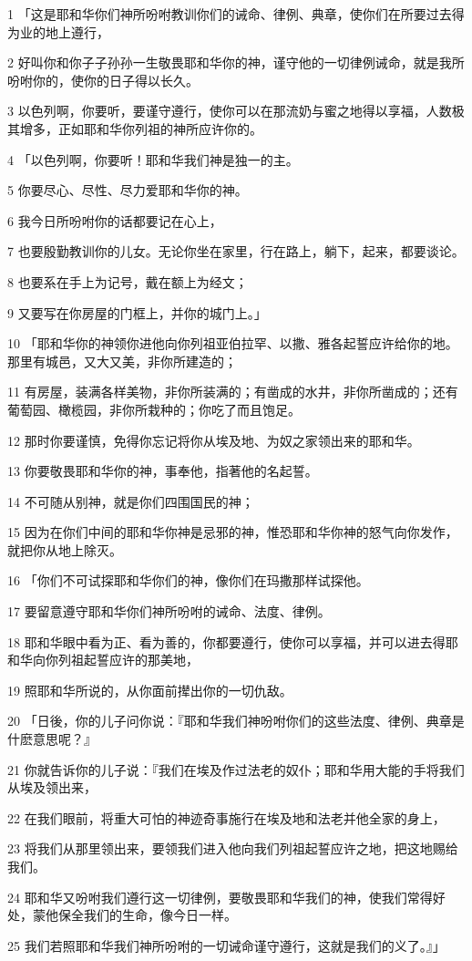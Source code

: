 \par 1 「这是耶和华你们神所吩咐教训你们的诫命、律例、典章，使你们在所要过去得为业的地上遵行，
\par 2 好叫你和你子子孙孙一生敬畏耶和华你的神，谨守他的一切律例诫命，就是我所吩咐你的，使你的日子得以长久。
\par 3 以色列啊，你要听，要谨守遵行，使你可以在那流奶与蜜之地得以享福，人数极其增多，正如耶和华你列祖的神所应许你的。
\par 4 「以色列啊，你要听！耶和华我们神是独一的主。
\par 5 你要尽心、尽性、尽力爱耶和华你的神。
\par 6 我今日所吩咐你的话都要记在心上，
\par 7 也要殷勤教训你的儿女。无论你坐在家里，行在路上，躺下，起来，都要谈论。
\par 8 也要系在手上为记号，戴在额上为经文；
\par 9 又要写在你房屋的门框上，并你的城门上。」
\par 10 「耶和华你的神领你进他向你列祖亚伯拉罕、以撒、雅各起誓应许给你的地。那里有城邑，又大又美，非你所建造的；
\par 11 有房屋，装满各样美物，非你所装满的；有凿成的水井，非你所凿成的；还有葡萄园、橄榄园，非你所栽种的；你吃了而且饱足。
\par 12 那时你要谨慎，免得你忘记将你从埃及地、为奴之家领出来的耶和华。
\par 13 你要敬畏耶和华你的神，事奉他，指著他的名起誓。
\par 14 不可随从别神，就是你们四围国民的神；
\par 15 因为在你们中间的耶和华你神是忌邪的神，惟恐耶和华你神的怒气向你发作，就把你从地上除灭。
\par 16 「你们不可试探耶和华你们的神，像你们在玛撒那样试探他。
\par 17 要留意遵守耶和华你们神所吩咐的诫命、法度、律例。
\par 18 耶和华眼中看为正、看为善的，你都要遵行，使你可以享福，并可以进去得耶和华向你列祖起誓应许的那美地，
\par 19 照耶和华所说的，从你面前撵出你的一切仇敌。
\par 20 「日後，你的儿子问你说：『耶和华我们神吩咐你们的这些法度、律例、典章是什麽意思呢？』
\par 21 你就告诉你的儿子说：『我们在埃及作过法老的奴仆；耶和华用大能的手将我们从埃及领出来，
\par 22 在我们眼前，将重大可怕的神迹奇事施行在埃及地和法老并他全家的身上，
\par 23 将我们从那里领出来，要领我们进入他向我们列祖起誓应许之地，把这地赐给我们。
\par 24 耶和华又吩咐我们遵行这一切律例，要敬畏耶和华我们的神，使我们常得好处，蒙他保全我们的生命，像今日一样。
\par 25 我们若照耶和华我们神所吩咐的一切诫命谨守遵行，这就是我们的义了。』」

